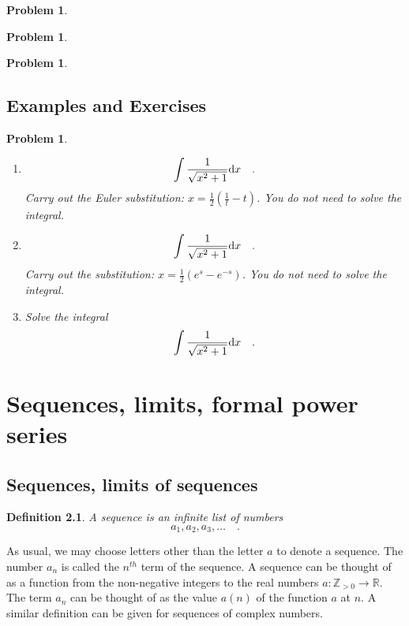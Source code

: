 \documentclass[12pt]{book}
\newtheorem{definition}[theorem]{Definition}
\newtheorem{problem}[theorem]{Problem}
\begin{document}
\begin{problem}

\end{problem}

\begin{problem}

\end{problem}



\begin{problem}

\end{problem}

\section{Examples and Exercises}
\begin{problem}~
\begin{enumerate}
\item
\[
\int \frac{1}{\sqrt{x^2+1}}{\normalfont \text{d}} x\quad .
\]
Carry out the Euler substitution: $x=\frac12\left(\frac{1}{t}- t\right)$. You do not need to solve the integral.
\item
\[
\int \frac{1}{\sqrt{x^2+1}}{\normalfont \text{d}} x\quad .
\]
Carry out the substitution: $x=\frac12\left(e^s- e^{-s}\right)$. You do not need to solve the integral.
\item Solve the integral
\[
\int \frac{1}{\sqrt{x^2+1}}{\normalfont \text{d}} x\quad .
\]
\end{enumerate}
\end{problem}



\chapter{Sequences, limits, formal power series}\label{secSequencesPowerSeries}
\section{Sequences, limits of sequences}
\begin{definition}
 A sequence is an infinite list of numbers
\[
a_1, a_2, a_3, \dots\quad .
\]
\end{definition}
As usual, we may choose letters other than the letter $a$ to denote a sequence. The number $a_n$ is called the $n^{th}$ term of the sequence. A sequence can be thought of as a function from the non-negative integers to the real numbers $a: \mathbb Z_{>0}\to \mathbb R$. The term $a_n$ can be thought of as the value $a(n)$ of the function $a$ at $n$. A similar definition can be given for sequences of complex numbers.
\end{document}
